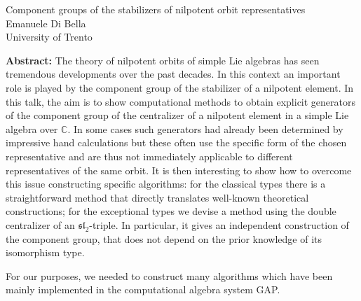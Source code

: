 \documentclass[12pt,a4paper]{article}
\begin{document}
\thispagestyle{empty} 
\begin{center}
{\large  Component groups of the stabilizers of nilpotent orbit representatives}\\
\vspace*{.5cm}
Emanuele Di Bella\\
University of Trento\\
\end{center}
\vspace*{.8cm}

{\bf Abstract:} The theory of nilpotent orbits of simple Lie algebras has seen tremendous developments over the past decades. In this context an important role is played by the component group of the stabilizer of a nilpotent element. In this talk, the aim is to show computational methods to obtain explicit generators of the component group of the centralizer of a nilpotent element in a simple Lie algebra over $\mathbb{C}$. In some cases such generators had already been determined by impressive hand calculations but these often use the specific form of the chosen representative and are thus not immediately applicable to different representatives of the same orbit. It is then interesting to show how to overcome this issue constructing specific algorithms: for the classical types there is a straightforward method that directly translates well-known theoretical constructions; for the exceptional types we devise a method using the double centralizer of an $\mathfrak{sl}_2$-triple. In particular, it gives an independent construction of the component group, that does not depend on the prior knowledge of its isomorphism type.


For our purposes, we needed to construct many algorithms which have been mainly implemented in the computational algebra system GAP.
\end{document}
